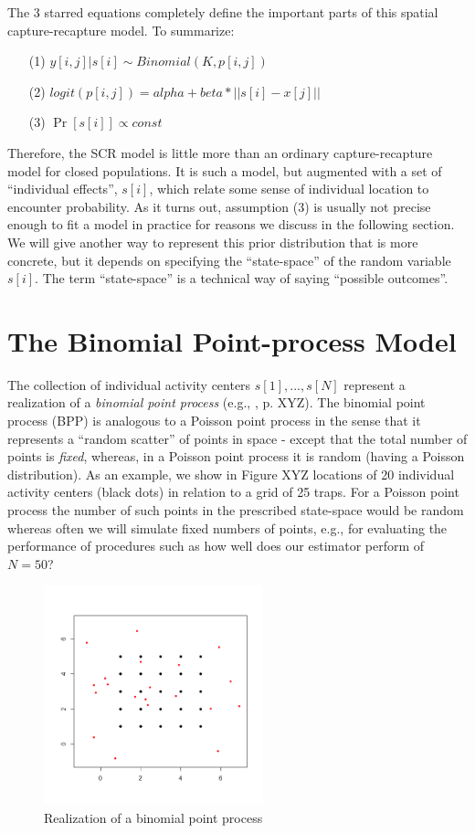 The 3 starred equations completely define the important parts of this spatial capture-recapture model. To summarize:
\begin{itemize}
\item[(1)] $y[i,j]|s[i] \sim Binomial(K, p[i,j])	$
\item[(2)] $logit(p[i,j]) = alpha + beta*||s[i]-x[j]||$
\item[(3)] $\Pr[s[i] ] \propto const$	
\end{itemize}			
Therefore, the SCR model is little more than an ordinary capture-recapture model for closed populations. It is such a model, but augmented with a set of ``individual effects'', $s[i]$, which relate some sense of individual location to encounter probability. 
As it turns out, assumption (3) is usually not precise enough to fit a model in practice for reasons we discuss in the following section.  We will give another way to represent this prior distribution that is more concrete, but it depends on specifying the ``state-space'' of the random variable $s[i]$. The term ``state-space'' is a technical way of saying ``possible outcomes''.


\section{ The Binomial Point-process Model}
The collection of individual activity centers $s[1], ..., s[N]$ represent a realization of a {\it binomial point process} (e.g., \citet{illian_etal:2008}, p. XYZ).  The binomial point process (BPP) is analogous to a Poisson point process in the sense that it represents a ``random scatter'' of points in space - except that the total number of points is {\it fixed}, whereas, in a Poisson point process it is random (having a Poisson distribution).  As an example, we show in Figure XYZ locations of 20 individual activity centers (black dots) in relation to a grid of 25 traps. For a Poisson point process the number of such points in the prescribed state-space would be random whereas often we will simulate fixed numbers of points, e.g., for evaluating the performance of procedures such as how well does our estimator perform of $N=50$? \begin{figure}
\begin{center}
\includegraphics[height=2.5in]{figs/binomialpoint}
\end{center}
\caption{Realization of a binomial point process}
\label{fig.binomialpoint}
\end{figure}

